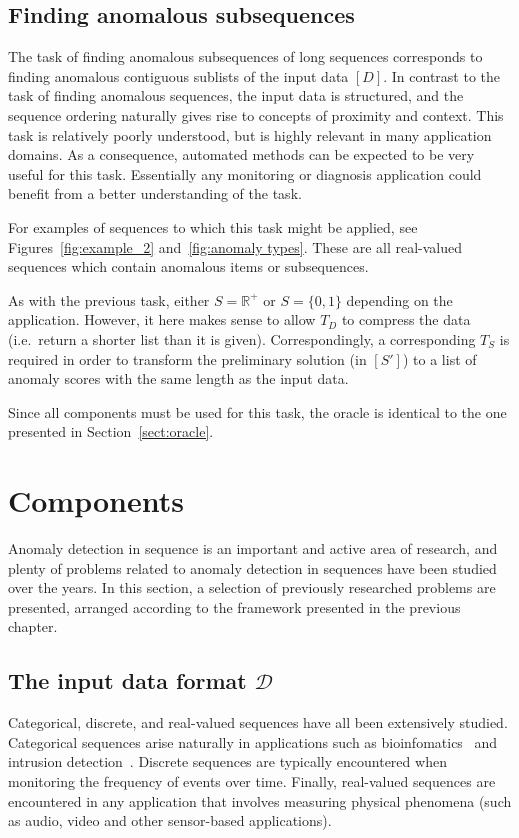 \subsection{Finding anomalous subsequences}

The task of finding anomalous subsequences of long sequences corresponds to finding anomalous contiguous sublists of the input data $[D]$. In contrast to the task of finding anomalous sequences, the input data is structured, and the sequence ordering naturally gives rise to concepts of proximity and context. This task is relatively poorly understood, but is highly relevant in many application domains. As a consequence, automated methods can be expected to be very useful for this task. Essentially any monitoring or diagnosis application could benefit from a better understanding of the task.

For examples of sequences to which this task might be applied, see Figures~\ref{fig:example_2} and~\ref{fig:anomaly types}. These are all real-valued sequences which contain anomalous items or subsequences.

As with the previous task, either $S = \mathbb{R}^+$ or $S = \{0, 1\}$ depending on the application. However, it here makes sense to allow $T_D$ to compress the data (i.e.\ return a shorter list than it is given). Correspondingly, a corresponding $T_S$ is required in order to transform the preliminary solution (in $[S']$) to a list of anomaly scores with the same length as the input data.

Since all components must be used for this task, the oracle is identical to the one presented in Section~\ref{sect:oracle}.

\section{Components}
\label{sect:prev_research}

Anomaly detection in sequence is an important and active area of research, and plenty of problems related to anomaly detection in sequences have been studied over the years. In this section, a selection of previously researched problems are presented, arranged according to the framework presented in the previous chapter.

\subsection{The input data format $\mathcal{D}$}

Categorical, discrete, and real-valued sequences have all been extensively studied. Categorical sequences arise naturally in applications such as bioinfomatics~\cite{TODO} and intrusion detection~\cite{TODO}. Discrete sequences are typically encountered when monitoring the frequency of events over time. Finally, real-valued sequences are encountered in any application that involves measuring physical phenomena (such as audio, video and other sensor-based applications).

